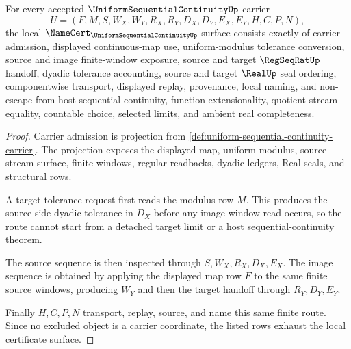 \begin{theorem}
\label{thm:uniform-sequential-continuity-namecert-obligations}
For every accepted $\UniformSequentialContinuityUp$ carrier
$$
U=(F,M,S,W_X,W_Y,R_X,R_Y,D_X,D_Y,E_X,E_Y,H,C,P,N),
$$
the local $\NameCert_{\UniformSequentialContinuityUp}$ surface consists exactly of carrier admission, displayed continuous-map use, uniform-modulus tolerance conversion, source and image finite-window exposure, source and target $\RegSeqRatUp$ handoff, dyadic tolerance accounting, source and target $\RealUp$ seal ordering, componentwise transport, displayed replay, provenance, local naming, and non-escape from host sequential continuity, function extensionality, quotient stream equality, countable choice, selected limits, and ambient real completeness.
\end{theorem}
\begin{proof}
Carrier admission is projection from \autoref{def:uniform-sequential-continuity-carrier}. The projection exposes the displayed map, uniform modulus, source stream surface, finite windows, regular readbacks, dyadic ledgers, Real seals, and structural rows.

A target tolerance request first reads the modulus row $M$. This produces the source-side dyadic tolerance in $D_X$ before any image-window read occurs, so the route cannot start from a detached target limit or a host sequential-continuity theorem.

The source sequence is then inspected through $S,W_X,R_X,D_X,E_X$. The image sequence is obtained by applying the displayed map row $F$ to the same finite source windows, producing $W_Y$ and then the target handoff through $R_Y,D_Y,E_Y$.

Finally $H,C,P,N$ transport, replay, source, and name this same finite route. Since no excluded object is a carrier coordinate, the listed rows exhaust the local certificate surface.
\end{proof}

